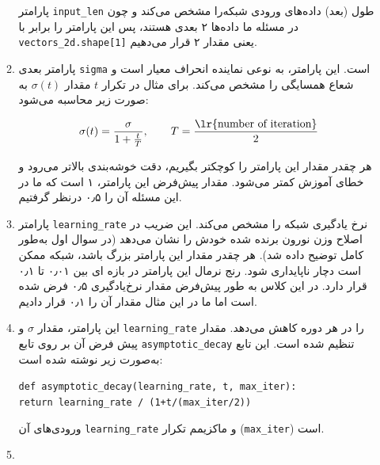 \begin{enumerate}
\begin{qsolve}
\begin{enumerate}
پارامتر \texttt{input\_len} طول (بعد) داده‌های ورودی شبکه‌را مشخص می‌کند و چون در مسئله ما داده‌ها ۲ بعدی هستند، پس این پارامتر را برابر با \texttt{vectors\_2d.shape[1]} یعنی مقدار ۲ قرار می‌دهیم.
			
			
			
			
			\item{}

پارامتر بعدی \texttt{sigma} است. این پارامتر، به نوعی نماینده انحراف معیار است و شعاع همسایگی را مشخص می‌کند. برای مثال در تکرار $t$ مقدار
$\sigma (t)$ به صورت زیر محاسبه می‌شود:

$$ \sigma (t)= \frac{\sigma}{1+\frac{t}{T}}, \qquad T=\frac{\text{\lr{number of iteration}}}{2}$$


هر چقدر مقدار این پارامتر را کوچکتر بگیریم، دقت خوشه‌بندی بالاتر می‌رود و خطای آموزش کمتر می‌شود. مقدار پیش‌فرض این پارامتر، ۱ است که ما در این مسئله آن را ۰٫۵ درنظر گرفتیم.



			\item{}

 پارامتر \texttt{learning\_rate} نرخ یادگیری شبکه را مشخص می‌کند. این ضریب در اصلاح وزن نورون برنده شده خودش را نشان می‌دهد (در سوال اول به‌طور کامل توضیح داده شد). هر چقدر مقدار این پارامتر بزرگ باشد، شبکه ممکن است دچار ناپایداری شود. رنج نرمال این پارامتر در بازه ای بین ۰٫۰۱ تا ۰٫۱ قرار دارد. در این کلاس به طور پیش‌فرض مقدار نرخ‌یادگیری ۰٫۵ فرض شده است اما ما در این مثال مقدار آن را ۰٫۱ قرار دادیم.
 
 
 
 
 			\item{}
 			
 			این پارامتر، مقدار $\sigma$ و \texttt{learning\_rate} را در هر دوره کاهش می‌دهد. مقدار پیش فرض آن بر روی تابع \texttt{asymptotic\_decay} تنظیم شده است. این تابع به‌صورت زیر نوشته شده است:
 			
 			\begin{latin}
 				\texttt{def asymptotic\_decay(learning\_rate, t, max\_iter):}\\
 				\qquad \texttt{return learning\_rate / (1+t/(max\_iter/2))}
 			\end{latin}
	 		
	 		ورودی‌های آن \texttt{learning\_rate} و ماکزیمم تکرار (\texttt{max\_iter}) است.
	 		
	 		
	 		
	 		
	 		\item{}
	 		

\end{enumerate}
\end{qsolve}
\end{enumerate}
